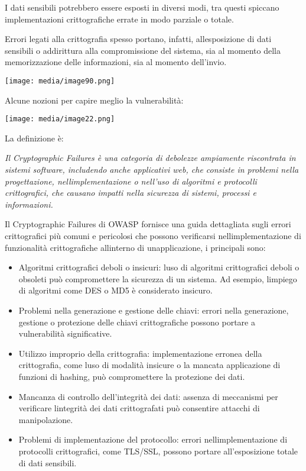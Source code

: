 I dati sensibili potrebbero essere esposti in diversi modi, tra questi
spiccano implementazioni crittografiche errate in modo parziale o
totale.

Errori legati alla crittografia spesso portano, infatti,
all\textquotesingle esposizione di dati sensibili o addirittura alla
compromissione del sistema, sia al momento della memorizzazione delle
informazioni, sia al momento dell'invio.

\texttt{[image: media/image90.png]}

Alcune nozioni per capire meglio la vulnerabilità:

\texttt{[image: media/image22.png]}

La definizione è:

\emph{Il Cryptographic Failures è una categoria di debolezze ampiamente
riscontrata in sistemi software, includendo anche applicativi web, che
consiste in problemi nella progettazione,
nell\textquotesingle implementazione o nell'uso di algoritmi e
protocolli crittografici, che causano impatti nella sicurezza di
sistemi, processi e informazioni.}

Il Cryptographic Failures di OWASP fornisce una guida dettagliata sugli
errori crittografici più comuni e pericolosi che possono verificarsi
nell\textquotesingle implementazione di funzionalità crittografiche
all\textquotesingle interno di un\textquotesingle applicazione, i
principali sono:

\begin{itemize}
\item
  Algoritmi crittografici deboli o insicuri: l\textquotesingle uso di
  algoritmi crittografici deboli o obsoleti può compromettere la
  sicurezza di un sistema. Ad esempio, l\textquotesingle impiego di
  algoritmi come DES o MD5 è considerato insicuro.
\item
  Problemi nella generazione e gestione delle chiavi: errori nella
  generazione, gestione o protezione delle chiavi crittografiche possono
  portare a vulnerabilità significative.
\item
  Utilizzo improprio della crittografia: implementazione erronea della
  crittografia, come l\textquotesingle uso di modalità insicure o la
  mancata applicazione di funzioni di hashing, può compromettere la
  protezione dei dati.
\item
  Mancanza di controllo dell'integrità dei dati: assenza di meccanismi
  per verificare l\textquotesingle integrità dei dati crittografati può
  consentire attacchi di manipolazione.
\item
  Problemi di implementazione del protocollo: errori
  nell\textquotesingle implementazione di protocolli crittografici, come
  TLS/SSL, possono portare all'esposizione totale di dati sensibili.
\end{itemize}

